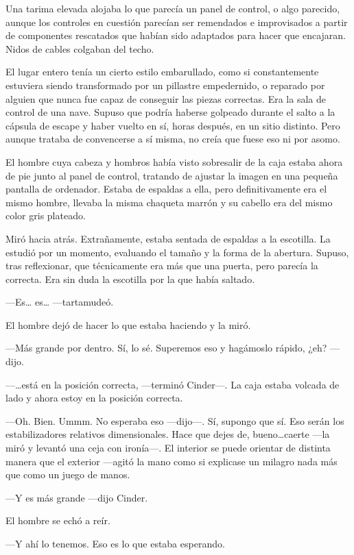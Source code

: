 Una tarima elevada alojaba lo que parecía un panel de control, o algo parecido, aunque los controles en cuestión parecían ser remendados e improvisados a partir de componentes rescatados que habían sido adaptados para hacer que encajaran. Nidos de cables colgaban del techo. 

El lugar entero tenía un cierto estilo embarullado, como si constantemente estuviera siendo transformado por un pillastre empedernido, o reparado por alguien que nunca fue capaz de conseguir las piezas correctas. Era la sala de control de una nave. Supuso que podría haberse golpeado durante el salto a la cápsula de escape y haber vuelto en sí, horas después, en un sitio distinto. Pero aunque trataba de convencerse a sí misma, no creía que fuese eso ni por asomo. 

El hombre cuya cabeza y hombros había visto sobresalir de la caja estaba ahora de pie junto al panel de control, tratando de ajustar la imagen en una pequeña pantalla de ordenador. Estaba de espaldas a ella, pero definitivamente era el mismo hombre, llevaba la misma chaqueta marrón y su cabello era del mismo color gris plateado. 

Miró hacia atrás. Extrañamente, estaba sentada de espaldas a la escotilla. La estudió por un momento, evaluando el tamaño y la forma de la abertura. Supuso, tras reflexionar, que técnicamente era más que una puerta, pero parecía la correcta. Era sin duda la escotilla por la que había saltado. 

—Es… es… —tartamudeó. 

El hombre dejó de hacer lo que estaba haciendo y la miró. 



—Más grande por dentro. Sí, lo sé. Superemos eso y hagámoslo rápido, ¿eh? —dijo. 

—…está en la posición correcta, —terminó Cinder—. La caja estaba volcada de lado y ahora estoy en la posición correcta. 

—Oh. Bien. Ummm. No esperaba eso —dijo—. Sí, supongo que sí. Eso serán los estabilizadores relativos dimensionales. Hace que dejes de, bueno…caerte —la miró y levantó una ceja con ironía—. El interior se puede orientar de distinta manera que el exterior —agitó la mano como si explicase un milagro nada más que como un juego de manos. 

—Y es más grande —dijo Cinder. 

El hombre se echó a reír. 

—Y ahí lo tenemos. Eso es lo que estaba esperando. 

